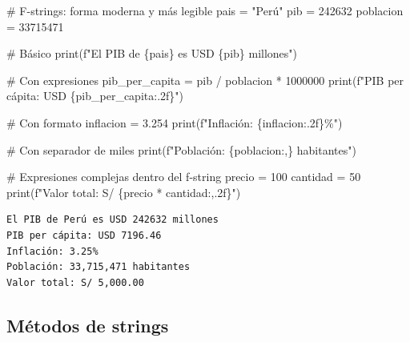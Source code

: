 \documentclass[
  doc,
  floatsintext,
  longtable,
  a4paper,
  nolmodern,
  notxfonts,
  notimes,
  12pt,
  colorlinks=true,linkcolor=blue,citecolor=blue,urlcolor=blue]{apa7}
\newenvironment{Shaded}{\begin{snugshade}}{\end{snugshade}}
\newcommand{\BuiltInTok}[1]{\textcolor[rgb]{0.00,0.23,0.31}{#1}}
\newcommand{\CommentTok}[1]{\textcolor[rgb]{0.37,0.37,0.37}{#1}}
\newcommand{\DecValTok}[1]{\textcolor[rgb]{0.68,0.00,0.00}{#1}}
\newcommand{\FloatTok}[1]{\textcolor[rgb]{0.68,0.00,0.00}{#1}}
\newcommand{\NormalTok}[1]{\textcolor[rgb]{0.00,0.23,0.31}{#1}}
\newcommand{\OperatorTok}[1]{\textcolor[rgb]{0.37,0.37,0.37}{#1}}
\newcommand{\SpecialCharTok}[1]{\textcolor[rgb]{0.37,0.37,0.37}{#1}}
\newcommand{\SpecialStringTok}[1]{\textcolor[rgb]{0.13,0.47,0.30}{#1}}
\newcommand{\StringTok}[1]{\textcolor[rgb]{0.13,0.47,0.30}{#1}}
\begin{document}
\begin{Shaded}
\begin{Highlighting}[]
\CommentTok{\# F{-}strings: forma moderna y más legible}
\NormalTok{pais }\OperatorTok{=} \StringTok{"Perú"}
\NormalTok{pib }\OperatorTok{=} \DecValTok{242632}
\NormalTok{poblacion }\OperatorTok{=} \DecValTok{33715471}

\CommentTok{\# Básico}
\BuiltInTok{print}\NormalTok{(}\SpecialStringTok{f"El PIB de }\SpecialCharTok{\{}\NormalTok{pais}\SpecialCharTok{\}}\SpecialStringTok{ es USD }\SpecialCharTok{\{}\NormalTok{pib}\SpecialCharTok{\}}\SpecialStringTok{ millones"}\NormalTok{)}

\CommentTok{\# Con expresiones}
\NormalTok{pib\_per\_capita }\OperatorTok{=}\NormalTok{ pib }\OperatorTok{/}\NormalTok{ poblacion }\OperatorTok{*} \DecValTok{1000000}
\BuiltInTok{print}\NormalTok{(}\SpecialStringTok{f"PIB per cápita: USD }\SpecialCharTok{\{}\NormalTok{pib\_per\_capita}\SpecialCharTok{:.2f\}}\SpecialStringTok{"}\NormalTok{)}

\CommentTok{\# Con formato}
\NormalTok{inflacion }\OperatorTok{=} \FloatTok{3.254}
\BuiltInTok{print}\NormalTok{(}\SpecialStringTok{f"Inflación: }\SpecialCharTok{\{}\NormalTok{inflacion}\SpecialCharTok{:.2f\}}\SpecialStringTok{\%"}\NormalTok{)}

\CommentTok{\# Con separador de miles}
\BuiltInTok{print}\NormalTok{(}\SpecialStringTok{f"Población: }\SpecialCharTok{\{}\NormalTok{poblacion}\SpecialCharTok{:,\}}\SpecialStringTok{ habitantes"}\NormalTok{)}

\CommentTok{\# Expresiones complejas dentro del f{-}string}
\NormalTok{precio }\OperatorTok{=} \DecValTok{100}
\NormalTok{cantidad }\OperatorTok{=} \DecValTok{50}
\BuiltInTok{print}\NormalTok{(}\SpecialStringTok{f"Valor total: S/ }\SpecialCharTok{\{}\NormalTok{precio }\OperatorTok{*}\NormalTok{ cantidad}\SpecialCharTok{:,.2f\}}\SpecialStringTok{"}\NormalTok{)}
\end{Highlighting}
\end{Shaded}

\begin{verbatim}
El PIB de Perú es USD 242632 millones
PIB per cápita: USD 7196.46
Inflación: 3.25%
Población: 33,715,471 habitantes
Valor total: S/ 5,000.00
\end{verbatim}

\subsection{Métodos de strings}\label{muxe9todos-de-strings}
\end{document}
